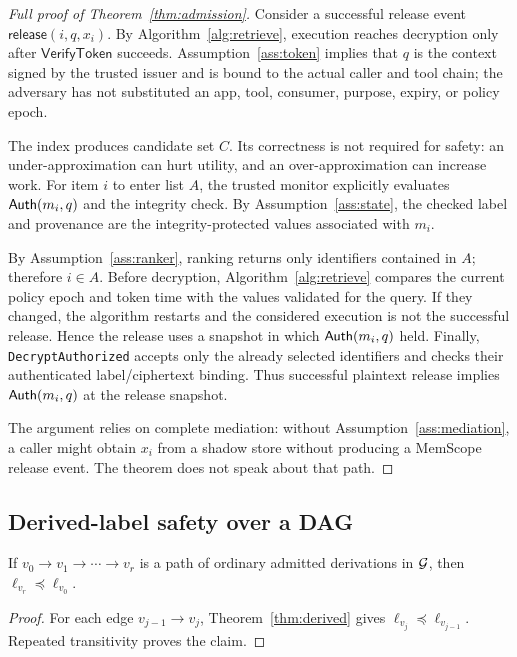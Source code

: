 \begin{proof}[Full proof of Theorem~\ref{thm:admission}]
Consider a successful release event $\mathsf{release}(i,q,x_i)$. By Algorithm~\ref{alg:retrieve}, execution reaches decryption only after $\mathsf{VerifyToken}$ succeeds. Assumption~\ref{ass:token} implies that $q$ is the context signed by the trusted issuer and is bound to the actual caller and tool chain; the adversary has not substituted an app, tool, consumer, purpose, expiry, or policy epoch.

The index produces candidate set $C$. Its correctness is not required for safety: an under-approximation can hurt utility, and an over-approximation can increase work. For item $i$ to enter list $A$, the trusted monitor explicitly evaluates $\mathsf{Auth}(m_i,q)$ and the integrity check. By Assumption~\ref{ass:state}, the checked label and provenance are the integrity-protected values associated with $m_i$.

By Assumption~\ref{ass:ranker}, ranking returns only identifiers contained in $A$; therefore $i\in A$. Before decryption, Algorithm~\ref{alg:retrieve} compares the current policy epoch and token time with the values validated for the query. If they changed, the algorithm restarts and the considered execution is not the successful release. Hence the release uses a snapshot in which $\mathsf{Auth}(m_i,q)$ held. Finally, \texttt{DecryptAuthorized} accepts only the already selected identifiers and checks their authenticated label/ciphertext binding. Thus successful plaintext release implies $\mathsf{Auth}(m_i,q)$ at the release snapshot.

The argument relies on complete mediation: without Assumption~\ref{ass:mediation}, a caller might obtain $x_i$ from a shadow store without producing a MemScope release event. The theorem does not speak about that path.
\end{proof}

\subsection{Derived-label safety over a DAG}

\begin{lemma}
\label{lem:path}
If $v_0\to v_1\to\cdots\to v_r$ is a path of ordinary admitted derivations in $\mathcal{G}$, then $\ell_{v_r}\preceq\ell_{v_0}$.
\end{lemma}
\begin{proof}
For each edge $v_{j-1}\to v_j$, Theorem~\ref{thm:derived} gives $\ell_{v_j}\preceq\ell_{v_{j-1}}$. Repeated transitivity proves the claim.
\end{proof}

